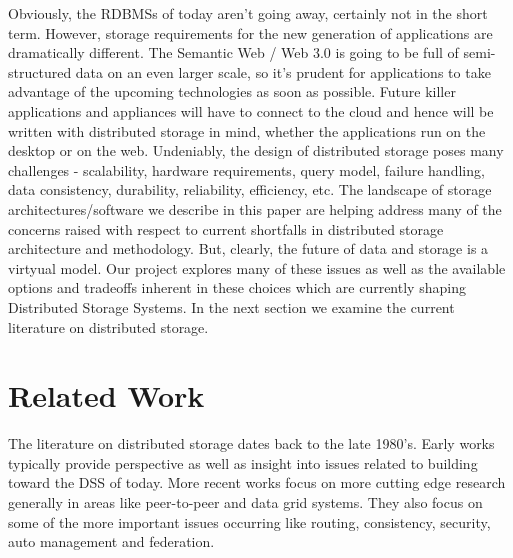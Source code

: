 \documentclass[11pt]{article}
\begin{document}
Obviously, the RDBMSs of today aren't going away, certainly not in the
short term. However, storage requirements for the new generation of
applications are dramatically different. The Semantic Web / Web 3.0 is
going to be full of semi-structured data on an even larger scale, so
it's prudent for applications to take advantage of the upcoming
technologies as soon as possible. Future killer applications and
appliances will have to connect to the cloud and hence will be written
with distributed storage in mind, whether the applications run on the
desktop or on the web. Undeniably, the design of distributed storage
poses many challenges - scalability, hardware requirements, query
model, failure handling, data consistency, durability, reliability,
efficiency, etc. The landscape of storage architectures/software we
describe in this paper are helping address many of the concerns raised
with respect to current shortfalls in distributed storage architecture
and methodology. But, clearly, the future of data and storage is a
virtyual model. Our project explores many of these issues as well as
the available options and tradeoffs inherent in these choices which
are currently shaping Distributed Storage Systems. In the next section
we examine the current literature on distributed storage.

\section{Related Work}
The literature on distributed storage dates back to the
late 1980’s. Early works typically provide perspective as well as
insight into issues related to building toward the DSS of today. More
recent works focus on more cutting edge research generally in areas
like peer-to-peer and data grid systems. They also focus on some of
the more important issues occurring like routing, consistency,
security, auto management and federation.
\end{document}
